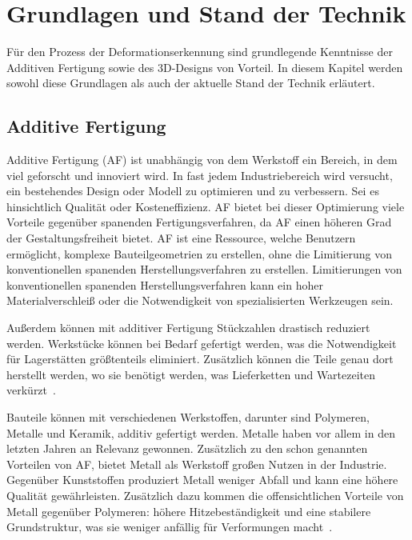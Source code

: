 \chapter{Grundlagen und Stand der Technik}

Für den Prozess der Deformationserkennung sind grundlegende Kenntnisse der 
Additiven Fertigung sowie des 3D-Designs von Vorteil. In diesem Kapitel 
werden sowohl diese Grundlagen als auch der aktuelle Stand der Technik 
erläutert.

\section{Additive Fertigung}

Additive Fertigung (AF) ist unabhängig von dem Werkstoff ein Bereich, in dem viel
geforscht und innoviert wird. In fast jedem Industriebereich wird versucht, ein
bestehendes Design oder Modell zu optimieren und zu verbessern.
Sei es hinsichtlich Qualität oder Kosteneffizienz. AF bietet bei 
dieser Optimierung viele Vorteile gegenüber spanenden Fertigungsverfahren, da 
AF einen höheren Grad der Gestaltungsfreiheit bietet. \cite{durakovic2018design}
AF ist eine Ressource, welche Benutzern ermöglicht, komplexe 
Bauteilgeometrien zu erstellen, ohne die Limitierung von konventionellen spanenden 
Herstellungsverfahren zu erstellen. 
Limitierungen von konventionellen spanenden 
Herstellungsverfahren kann ein hoher Materialverschleiß oder die Notwendigkeit von 
spezialisierten Werkzeugen sein.\ \cite{Vafadar.2021} 

Außerdem können mit additiver Fertigung Stückzahlen drastisch reduziert werden.
Werkstücke können bei Bedarf gefertigt werden, was die Notwendigkeit für Lagerstätten
größtenteils eliminiert. Zusätzlich können die Teile genau dort herstellt werden, wo 
sie benötigt werden, was Lieferketten und Wartezeiten verkürzt~\cite{Calignano.2023}.

Bauteile können mit verschiedenen Werkstoffen, darunter sind Polymeren, Metalle und Keramik, 
additiv gefertigt werden.
Metalle haben vor allem in den letzten Jahren 
an Relevanz gewonnen. Zusätzlich zu den schon genannten Vorteilen von AF, 
bietet Metall als Werkstoff großen Nutzen in der Industrie. Gegenüber Kunststoffen
produziert Metall weniger Abfall und kann eine höhere Qualität gewährleisten.
Zusätzlich dazu kommen die offensichtlichen Vorteile von Metall gegenüber Polymeren: 
höhere Hitzebeständigkeit und eine stabilere Grundstruktur, was sie weniger anfällig 
für Verformungen macht~\cite{Gardner.2023}.

